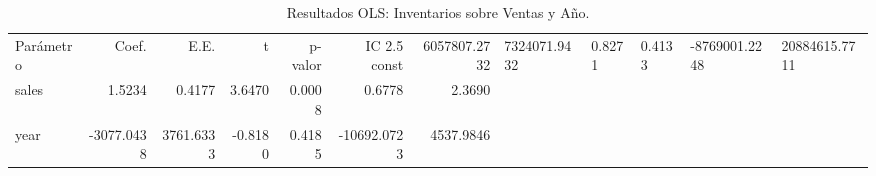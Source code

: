 \begin{table}
\caption{Resultados OLS: Inventarios sobre Ventas y Año.}
\label{tab:ex8_m2}
\begin{tabular}{lrrrrrr}
\toprule
Parámetro & Coef. & E.E. & t & p-valor & IC 2.5%
\midrule
const & 6057807.2732 & 7324071.9432 & 0.8271 & 0.4133 & -8769001.2248 & 20884615.7711 \\
sales & 1.5234 & 0.4177 & 3.6470 & 0.0008 & 0.6778 & 2.3690 \\
year & -3077.0438 & 3761.6333 & -0.8180 & 0.4185 & -10692.0723 & 4537.9846 \\
\bottomrule
\end{tabular}
\end{table}
